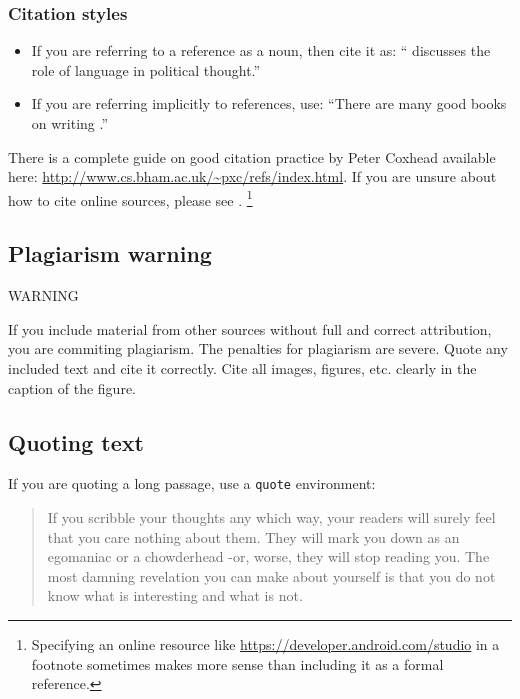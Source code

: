 \documentclass{l4proj}
\begin{document}
\subsubsection{Citation styles}

\begin{itemize}
\item If you are referring to a reference as a noun, then cite it as: ``\citet{Orw68} discusses the role of language in political thought.''
\item If you are referring implicitly to references, use: ``There are many good books on writing \citep{Orw68, Wil09, Pin15}.''
\end{itemize}

There is a complete guide on good citation practice by Peter Coxhead available here: \url{http://www.cs.bham.ac.uk/~pxc/refs/index.html}. 
If you are unsure about how to cite online sources, please see \citet{UNSWWebsite}. 
\footnote{Specifying an online resource like \url{https://developer.android.com/studio}
in a footnote sometimes makes more sense than including it as a formal reference.}

\subsection{Plagiarism warning}

\begin{highlight_title}{WARNING}
    
    If you include material from other sources without full and correct attribution, you are commiting plagiarism. The penalties for plagiarism are severe.
    Quote any included text and cite it correctly. Cite all images, figures, etc. clearly in the caption of the figure.
\end{highlight_title}

\subsection{Quoting text}

If you are quoting a long passage, use a \texttt{quote} environment:

\begin{quote}
     If you scribble your thoughts any which way, your readers will surely feel that you care nothing about them. They will mark you down as an egomaniac or a chowderhead -or, worse, they will stop reading you. The most damning revelation you can make about yourself is that you do not know what is interesting and what is not.
\end{quote} \citep{Von80}
\end{document}

